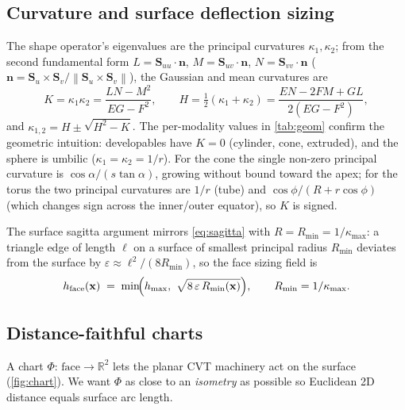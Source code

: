 \documentclass[11pt,a4paper]{article}
\numberwithin{equation}{section}
\newcommand{\R}{\mathbb{R}}
\newcommand{\norm}[1]{\left\lVert #1 \right\rVert}
\newcommand{\vv}[1]{\mathbf{#1}}
\newcommand{\Su}{\vv{S}_u}
\newcommand{\Sv}{\vv{S}_v}
\begin{document}
\subsection{Curvature and surface deflection sizing}
The shape operator's eigenvalues are the principal curvatures
$\kappa_1,\kappa_2$; from the second fundamental form
$L=\vv{S}_{uu}\!\cdot\!\vv{n}$, $M=\vv{S}_{uv}\!\cdot\!\vv{n}$,
$N=\vv{S}_{vv}\!\cdot\!\vv{n}$ ($\vv{n}=\Su\times\Sv/\norm{\Su\times\Sv}$), the
Gaussian and mean curvatures are
\begin{equation}
\label{eq:KH}
K=\kappa_1\kappa_2=\frac{LN-M^2}{EG-F^2},\qquad
H=\tfrac12(\kappa_1+\kappa_2)=\frac{EN-2FM+GL}{2(EG-F^2)},
\end{equation}
and $\kappa_{1,2}=H\pm\sqrt{H^2-K}$. The per-modality values in \cref{tab:geom}
confirm the geometric intuition: developables have $K=0$ (cylinder, cone,
extruded), and the sphere is umbilic ($\kappa_1=\kappa_2=1/r$). For the cone the
single non-zero principal curvature is $\cos\alpha/(s\tan\alpha)$, growing
without bound toward the apex; for the torus the two principal curvatures are
$1/r$ (tube) and $\cos\phi/(R+r\cos\phi)$ (which changes sign across the
inner/outer equator), so $K$ is signed.

\noindent
The surface sagitta argument mirrors \eqref{eq:sagitta} with $R=R_{\min}=
1/\kappa_{\max}$: a triangle edge of length $\ell$ on a surface of smallest
principal radius $R_{\min}$ deviates from the surface by
$\varepsilon\approx \ell^2/(8R_{\min})$, so the face sizing field is
\begin{equation}
\label{eq:surf_defl}
h_{\text{face}}(\vv{x}) \;=\;
\min\!\Bigl(h_{\max},\ \sqrt{8\,\varepsilon\,R_{\min}(\vv{x})}\Bigr),
\qquad R_{\min}=1/\kappa_{\max}.
\end{equation}

\subsection{Distance-faithful charts}
\label{sec:charts}
A chart $\Phi:\,\text{face}\to\R^2$ lets the planar CVT machinery act on the
surface (\cref{fig:chart}). We want $\Phi$ as close to an \emph{isometry} as
possible so Euclidean 2D distance equals surface arc length.
\end{document}
